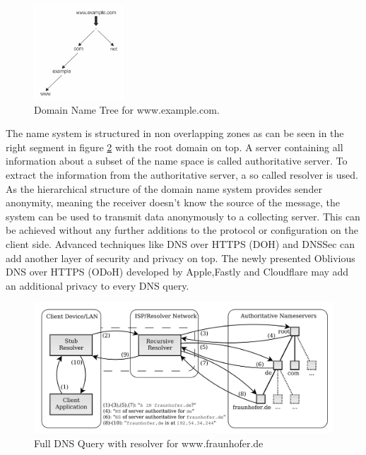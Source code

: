         \begin{figure}
            \includegraphics[width=0.3\textwidth]{latex/figures/domain_name_tree.jpg}
            \caption[Domain Name Tree for www.example.com.]{Domain Name Tree for www.example.com. \cite{jeftovic_managing_2018}}
            \label{fig:dns_tree}
        \end{figure}
        
        The name system is structured in non overlapping zones as can be seen in the right segment in figure \ref{fig:dns_query} with the root domain on top\cite{herrmann_beobachtungsmoglichkeiten_2016}.
        A server containing all information about a subset of the name space is called authoritative server. To extract the information from the authoritative server, a so called resolver is used\cite{friedewald_privacy_2018}.
        As the hierarchical structure of the domain name system provides sender anonymity, meaning the receiver doesn't know the source of the message, the system can be used to transmit data anonymously to a collecting server. This can be achieved without any further additions to the protocol or configuration on the client side.
        Advanced techniques like DNS over HTTPS (DOH)\cite{} and DNSSec\cite{} can add another layer of security and privacy on top. The newly presented Oblivious DNS over HTTPS (ODoH) developed by Apple,Fastly and Cloudflare may add an additional privacy to every DNS query\cite{verma_improving_2020}.
        
        
        
        \begin{figure}
            \centering
            \includegraphics[width=\textwidth]{latex/figures/dns_query.jpg}
            \caption[Full DNS Query with resolver for www.fraunhofer.de]{Full DNS Query with resolver for                 www.fraunhofer.de\cite{friedewald_privacy_2018}}
            \label{fig:dns_query}
        \end{figure}
        

